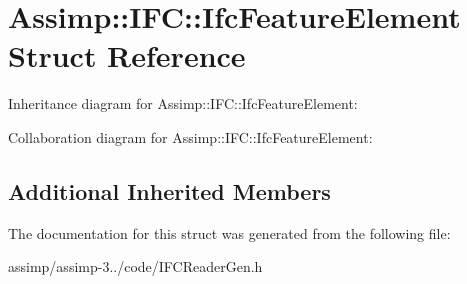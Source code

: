 \hypertarget{struct_assimp_1_1_i_f_c_1_1_ifc_feature_element}{\section{Assimp\+:\+:I\+F\+C\+:\+:Ifc\+Feature\+Element Struct Reference}
\label{struct_assimp_1_1_i_f_c_1_1_ifc_feature_element}
}


Inheritance diagram for Assimp\+:\+:I\+F\+C\+:\+:Ifc\+Feature\+Element\+:


Collaboration diagram for Assimp\+:\+:I\+F\+C\+:\+:Ifc\+Feature\+Element\+:
\subsection*{Additional Inherited Members}


The documentation for this struct was generated from the following file\+:\begin{DoxyCompactItemize}
\item 
assimp/assimp-\/3../code/I\+F\+C\+Reader\+Gen.\+h\end{DoxyCompactItemize}
